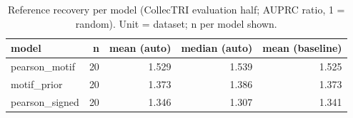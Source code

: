 \begin{table}[H]\centering\small
\caption{Reference recovery per model (CollecTRI evaluation half; AUPRC ratio, 1 = random). Unit = dataset; n per model shown.}
\begin{tabular}{lrrrr}\toprule
model & n & mean (auto) & median (auto) & mean (baseline) \\ \midrule
pearson\_motif & 20 & 1.529 & 1.539 & 1.525 \\
motif\_prior & 20 & 1.373 & 1.386 & 1.373 \\
pearson\_signed & 20 & 1.346 & 1.307 & 1.341 \\
\bottomrule\end{tabular}\end{table}
